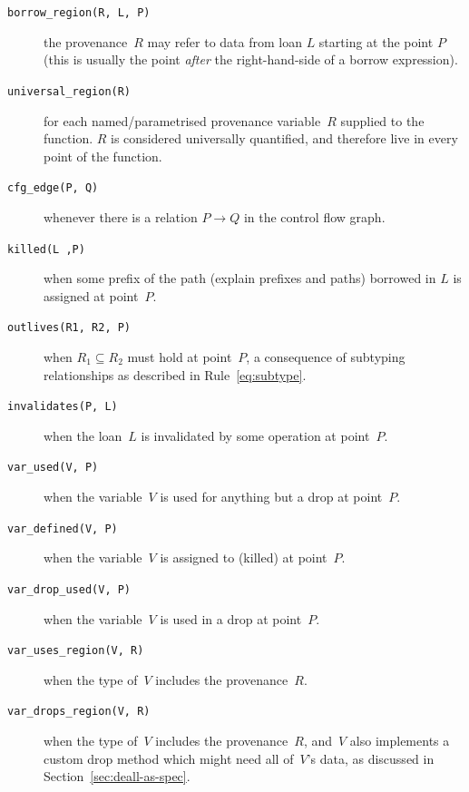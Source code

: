 \documentclass[11pt,a4paper,twoside,openany]{report}
\newcommand{\fixme}[1] {{\color{red}#1}}
\newcommand{\InDatalog}[1]{\texttt{#1}}
\begin{document}
\begin{description}
\item[\InDatalog{borrow_region(R, L, P)}] the provenance~$R$ may refer
  to data from loan $L$ starting at the point $P$ (this is usually the point
  \emph{after} the right-hand-side of a borrow expression).
  
\item[\InDatalog{universal_region(R)}] for each named/parametrised provenance
  variable~$R$ supplied to the function. $R$ is considered universally
  quantified, and therefore live in every point of the function.
  
\item[\InDatalog{cfg_edge(P, Q)}] whenever there is a relation $P \rightarrow Q$
  in the control flow graph.
    
\item[\InDatalog{killed(L ,P)}] when some prefix of the path (\fixme{explain
    prefixes and paths}) borrowed in $L$ is assigned at point~$P$.
    
\item[\InDatalog{outlives(R1, R2, P)}] when $R_1 \subseteq R_2$ must hold at
  point~$P$, a consequence of subtyping relationships as described in
  Rule~\eqref{eq:subtype}.
    
\item[\InDatalog{invalidates(P, L)}] when the loan~$L$ is invalidated by some
  operation at point~$P$.
    
\item[\InDatalog{var_used(V, P)}] when the variable~$V$ is used for anything but
  a drop at point~$P$.
    
\item[\InDatalog{var_defined(V, P)}] when the variable~$V$ is assigned to
  (killed) at point~$P$.
  
\item[\InDatalog{var_drop_used(V, P)}] when the variable~$V$ is used in a drop at point~$P$.

\item[\InDatalog{var_uses_region(V, R)}] when the type of~$V$ includes the
  provenance~$R$.

\item[\InDatalog{var_drops_region(V, R)}] when the type of~$V$ includes the
  provenance~$R$, and~$V$ also implements a custom drop method which might need
  all of~$V$'s data, as discussed in Section~\ref{sec:deall-as-spec}.
\end{description}
\end{document}
